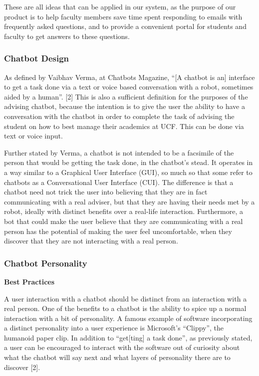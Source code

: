 \documentclass[titlepage, 12pt]{article}
\begin{document}
These are all ideas that can be applied in our system, as the purpose of our product is to help faculty members save time spent responding to emails with frequently asked questions, and to provide a convenient portal for students and faculty to get answers to these questions.

\subsubsection{Chatbot Design}

As defined by Vaibhav Verma, at Chatbots Magazine, “[A chatbot is an] interface to get a task done via a text or voice based conversation with a robot, sometimes aided by a human”. [2] This is also a sufficient definition for the purposes of the advising chatbot, because the intention is to give the user the ability to have a conversation with the chatbot in order to complete the task of advising the student on how to best manage their academics at UCF. This can be done via text or voice input.

Further stated by Verma, a chatbot is not intended to be a facsimile of the person that would be getting the task done, in the chatbot’s stead. It operates in a way similar to a Graphical User Interface (GUI), so much so that some refer to chatbots as a Conversational User Interface (CUI). The difference is that a chatbot need not trick the user into believing that they are in fact communicating with a real adviser, but that they are having their needs met by a robot, ideally with distinct benefits over a real-life interaction. Furthermore, a bot that could make the user believe that they are communicating with a real person has the potential of making the user feel uncomfortable, when they discover that they are not interacting with a real person.

\subsubsection{Chatbot Personality}

\textbf{Best Practices}

A user interaction with a chatbot should be distinct from an interaction with a real person. One of the benefits to a chatbot is the ability to spice up a normal interaction with a bit of personality. A famous example of software incorporating a distinct personality into a user experience is Microsoft’s “Clippy”, the humanoid paper clip. In addition to “get[ting] a task done”, as previously stated, a user can be encouraged to interact with the software out of curiosity about what the chatbot will say next and what layers of personality there are to discover [2].
 
\end{document}
